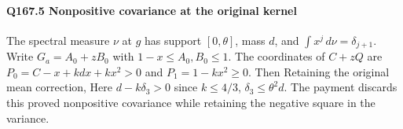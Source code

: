 \paragraph{Q167.5 Nonpositive covariance at the original kernel}\label{part:Q167.5}
The spectral measure $\nu$ at $g$ has support $[0,\allowbreak \theta]$, mass $d$,
and $\int x^j\,\allowbreak d\nu=\allowbreak \delta_{j+1}$.
Write $G_a=\allowbreak A_0+zB_0$ with $1-x\le\allowbreak  A_0,\allowbreak B_0\le\allowbreak 1$.
The coordinates of $C+zQ$ are
$P_0=\allowbreak C-x+kdx+kx^2>\allowbreak 0$ and $P_1=\allowbreak 1-kx^2\ge\allowbreak 0$.
Then
Retaining the original mean correction,
Here $d-k\delta_3>\allowbreak 0$ since $k\le\allowbreak 4/3$, $\delta_3\le\allowbreak \theta^2d$.
The payment discards this proved nonpositive covariance while retaining
the negative square in the variance.

